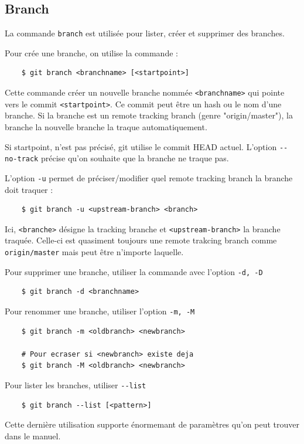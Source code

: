 \documentclass[a4paper, 12pt]{article}
\begin{document}
    \subsection{Branch}
    La commande \lstinline{branch} est utilisée pour lister, créer et supprimer
    des branches.
    
    Pour crée une branche, on utilise la commande : 
    \begin{lstlisting}
    $ git branch <branchname> [<startpoint>]
    \end{lstlisting}

    Cette commande créer un nouvelle branche nommée \lstinline{<branchname>} qui
    pointe vers le commit \lstinline{<startpoint>}. Ce commit peut être un hash
    ou le nom d'une branche. Si la branche est un remote tracking branch (genre
    "origin/master"), la branche la nouvelle branche la traque automatiquement.

    Si startpoint, n'est pas précisé, git utilise le commit HEAD actuel.
    L'option \lstinline{--no-track} précise qu'on souhaite que la branche ne
    traque pas.

    L'option \lstinline{-u} permet de préciser/modifier quel remote tracking
    branch la branche doit traquer :
    \begin{lstlisting}
    $ git branch -u <upstream-branch> <branch>
    \end{lstlisting}
    Ici, \lstinline{<branche>} désigne la tracking branche et
    \lstinline{<upstream-branch>} la branche traquée. Celle-ci est quasiment
    toujours une remote trakcing branch comme \lstinline{origin/master} mais
    peut être n'importe laquelle.

    Pour supprimer une branche, utiliser la commande avec l'option 
    \lstinline{-d, -D}
    \begin{lstlisting}
    $ git branch -d <branchname>
    \end{lstlisting}

    Pour renommer une branche, utiliser l'option \lstinline{-m, -M}
    \begin{lstlisting}
    $ git branch -m <oldbranch> <newbranch>

    # Pour ecraser si <newbranch> existe deja
    $ git branch -M <oldbranch> <newbranch>
    \end{lstlisting}

    Pour lister les branches, utiliser \lstinline{--list}
    \begin{lstlisting}
    $ git branch --list [<pattern>]
    \end{lstlisting}
    Cette dernière utilisation supporte énormemant de paramètres qu'on peut
    trouver dans le manuel.
\end{document}
